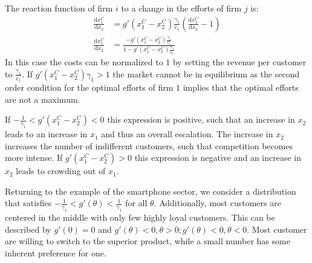 \documentclass[a4paper, 11pt]{article}
\renewcommand{\d}{\text{d}}
\begin{document}
The reaction function of firm $i$ to a change in the efforts of firm $j$ is:
\begin{align}
\frac{\d x_1^C}{\d x_2} &= g'(x_1^C-x_2^C)\frac{\gamma_1}{c_1}\left(\frac{\d x_1^C}{\d x_2}-1\right)\\
\frac{\d x_1^C}{\d x_2} &= \frac{-g'(x_1^C-x_2^C)\frac{\gamma_1}{c_1}}{1-g'(x_1^C-x_2^C)\frac{\gamma_1}{c_1}}
\end{align}
In this case the costs can be normalized to $1$ by setting the revenue per customer to $\frac{\gamma_1}{c_1}$. If $g'(x_1^C-x_2^C)\gamma_1 > 1$ the market cannot be in equilibrium as the second order condition for the optimal efforts of firm $1$  implies that the optimal efforts are not a maximum.

If $-\frac{1}{\gamma_1}<g'(x_1^C-x_2^C)<0$ this expression is positive, such that an increase in $x_2$ leads to an increase in $x_1$ and thus an overall escalation. The increase in $x_2$ increases the number of indifferent customers, such that competition becomes more intense. If $g'(x_1^C-x_2^C)>0$ this expression is negative and an increase in $x_2$ leads to crowding out of $x_1$. 

Returning to the example of the smartphone sector, we consider a distribution that satisfies $-\frac{1}{\gamma_1}<g'(\theta)<\frac{1}{\gamma_1}$ for all $\theta$. Additionally, most customers are centered in the middle with only few highly loyal customers. This can be described by $g'(0)=0$ and $g'(\theta)<0, \theta>0; g'(\theta)<0, \theta<0$. Most customer are willing to switch to the superior product, while a small number has some inherent preference for one.
\end{document}
